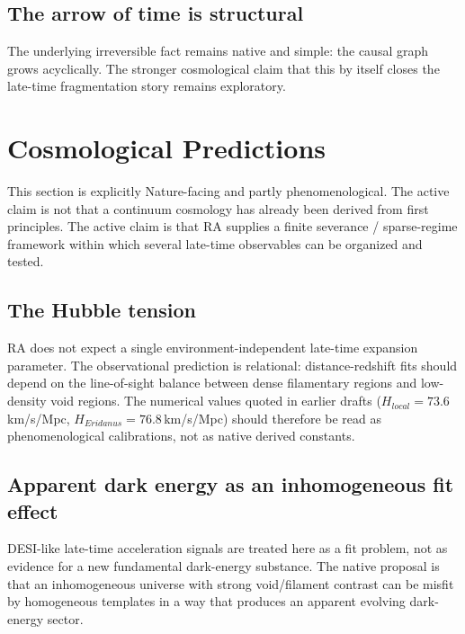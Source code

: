 \documentclass[11pt]{article}
\def\mathrm#1{#1}%
\begin{document}
\subsection{The arrow of time is structural}
\label{sec:arrow}

The underlying irreversible fact remains native and simple: the causal graph grows acyclically. The stronger cosmological claim that this by itself closes the late-time fragmentation story remains exploratory.

\section{Cosmological Predictions}
\label{sec:cosmology}

This section is explicitly Nature-facing and partly phenomenological. The active claim is not that a continuum cosmology has already been derived from first principles. The active claim is that RA supplies a finite severance / sparse-regime framework within which several late-time observables can be organized and tested.

\subsection{The Hubble tension}

RA does not expect a single environment-independent late-time expansion parameter. The observational prediction is relational: distance-redshift fits should depend on the line-of-sight balance between dense filamentary regions and low-density void regions. The numerical values quoted in earlier drafts ($H_{\mathrm{local}}=73.6$\,km/s/Mpc, $H_{\mathrm{Eridanus}}=76.8$\,km/s/Mpc) should therefore be read as phenomenological calibrations, not as native derived constants.

\subsection{Apparent dark energy as an inhomogeneous fit effect}
\label{sec:desi}

DESI-like late-time acceleration signals are treated here as a fit problem, not as evidence for a new fundamental dark-energy substance. The native proposal is that an inhomogeneous universe with strong void/filament contrast can be misfit by homogeneous templates in a way that produces an apparent evolving dark-energy sector.
\end{document}
